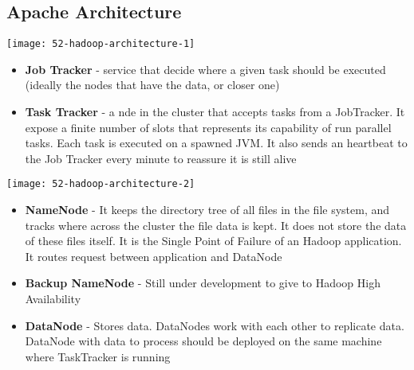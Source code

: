 \subsection{Apache Architecture}

\begin{center}
\texttt{[image: 52-hadoop-architecture-1]}
\end{center}

\begin{itemize}
	\item \textbf{Job Tracker}
	- service that decide where a given task should be executed (ideally the nodes that have the data, or closer one)
	\item \textbf{Task Tracker}
	- a nde in the cluster that accepts tasks from a JobTracker. It expose a finite number of slots that represents its capability of run parallel tasks. Each task is executed on a spawned JVM. It also sends an heartbeat to the Job Tracker every minute to reassure it is still alive
\end{itemize}

\begin{center}
\texttt{[image: 52-hadoop-architecture-2]}
\end{center}

\begin{itemize}
	\item \textbf{NameNode}
	- It keeps the directory tree of all files in the file system, and tracks where across the cluster the file data is kept. It does not store the data of these files itself. It is the Single Point of Failure of an Hadoop application. It routes request between application and DataNode
	\item \textbf{Backup NameNode}
	- Still under development to give to Hadoop High Availability
	\item \textbf{DataNode}
	- Stores data. DataNodes work with each other to replicate data. DataNode with data to process should be deployed on the same machine where TaskTracker is running
\end{itemize}

